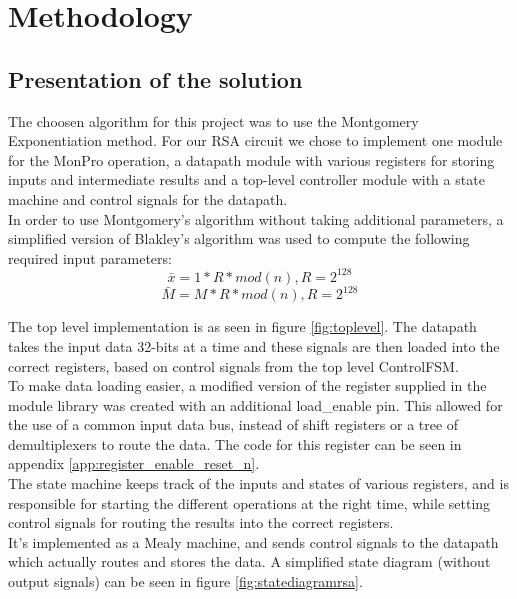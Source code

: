\chapter{Methodology}
\section{Presentation of the solution}
The choosen algorithm for this project was to use the Montgomery Exponentiation method. For our RSA circuit we chose to implement one module for the MonPro operation, a datapath module with various registers for storing inputs and intermediate results and a top-level controller module with a state machine and control signals for the datapath.\\
In order to use Montgomery's algorithm without taking additional parameters, a simplified version of Blakley's algorithm was used to compute the following required input parameters:
\begin{equation}
    \bar{x}=1*R*mod(n), R=2^{128}
\end{equation}
\begin{equation}
    \bar{M}=M*R*mod(n), R=2^{128}
\end{equation}

The top level implementation is as seen in figure \ref{fig:toplevel}. The datapath takes the input data 32-bits at a time and these signals are then loaded into the correct registers, based on control signals from the top level ControlFSM.\\
To make data loading easier, a modified version of the register supplied in the module library was created with an additional load\_enable pin. This allowed for the use of a common input data bus, instead of shift registers or a tree of demultiplexers to route the data. The code for this register can be seen in appendix \ref{app:register_enable_reset_n}.\\
The state machine keeps track of the inputs and states of various registers, and is responsible for starting the different operations at the right time, while setting control signals for routing the results into the correct registers.\\
It's implemented as a Mealy machine\cite{mealy}, and sends control signals to the datapath which actually routes and stores the data. A simplified state diagram (without output signals) can be seen in figure \ref{fig:statediagramrsa}.


